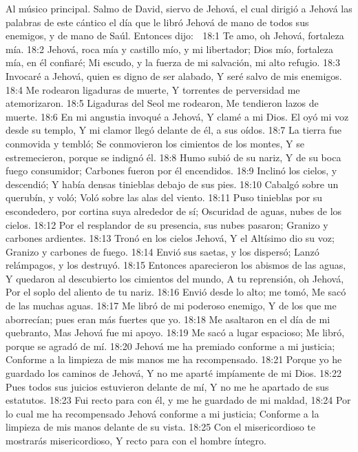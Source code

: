 Al músico principal. Salmo de David, siervo de Jehová, el cual dirigió a Jehová las palabras de este cántico el día que le libró Jehová de mano de todos sus enemigos, y de mano de Saúl. Entonces dijo: 

18:1 Te amo, oh Jehová, fortaleza mía. 
18:2 Jehová, roca mía y castillo mío, y mi libertador; 
Dios mío, fortaleza mía, en él confiaré; 
Mi escudo, y la fuerza de mi salvación, mi alto refugio. 
18:3 Invocaré a Jehová, quien es digno de ser alabado, 
Y seré salvo de mis enemigos. 
18:4 Me rodearon ligaduras de muerte, 
Y torrentes de perversidad me atemorizaron. 
18:5 Ligaduras del Seol me rodearon, 
Me tendieron lazos de muerte. 
18:6 En mi angustia invoqué a Jehová, 
Y clamé a mi Dios. 
El oyó mi voz desde su templo, 
Y mi clamor llegó delante de él, a sus oídos. 
18:7 La tierra fue conmovida y tembló; 
Se conmovieron los cimientos de los montes, 
Y se estremecieron, porque se indignó él. 
18:8 Humo subió de su nariz, 
Y de su boca fuego consumidor; 
Carbones fueron por él encendidos. 
18:9 Inclinó los cielos, y descendió; 
Y había densas tinieblas debajo de sus pies. 
18:10 Cabalgó sobre un querubín, y voló; 
Voló sobre las alas del viento. 
18:11 Puso tinieblas por su escondedero, por cortina suya alrededor de sí; 
Oscuridad de aguas, nubes de los cielos. 
18:12 Por el resplandor de su presencia, sus nubes pasaron; 
Granizo y carbones ardientes. 
18:13 Tronó en los cielos Jehová, 
Y el Altísimo dio su voz; 
Granizo y carbones de fuego. 
18:14 Envió sus saetas, y los dispersó; 
Lanzó relámpagos, y los destruyó. 
18:15 Entonces aparecieron los abismos de las aguas, 
Y quedaron al descubierto los cimientos del mundo, 
A tu reprensión, oh Jehová, 
Por el soplo del aliento de tu nariz. 
18:16 Envió desde lo alto; me tomó, 
Me sacó de las muchas aguas. 
18:17 Me libró de mi poderoso enemigo, 
Y de los que me aborrecían; pues eran más fuertes que yo. 
18:18 Me asaltaron en el día de mi quebranto, 
Mas Jehová fue mi apoyo. 
18:19 Me sacó a lugar espacioso; 
Me libró, porque se agradó de mí. 
18:20 Jehová me ha premiado conforme a mi justicia; 
Conforme a la limpieza de mis manos me ha recompensado. 
18:21 Porque yo he guardado los caminos de Jehová, 
Y no me aparté impíamente de mi Dios. 
18:22 Pues todos sus juicios estuvieron delante de mí, 
Y no me he apartado de sus estatutos. 
18:23 Fui recto para con él, y me he guardado de mi maldad, 
18:24 Por lo cual me ha recompensado Jehová conforme a mi justicia; 
Conforme a la limpieza de mis manos delante de su vista. 
18:25 Con el misericordioso te mostrarás misericordioso, 
Y recto para con el hombre íntegro. 
